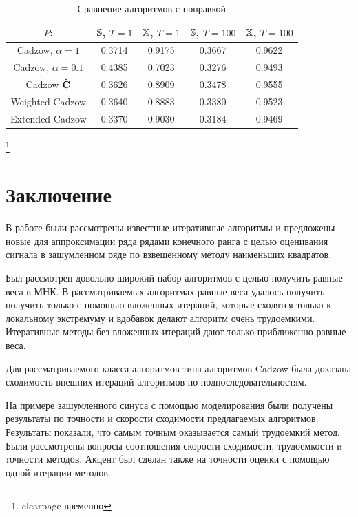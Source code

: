\documentclass[12pt,a4paper,fleqn,leqno]{article}
\begin{document}
\begin{table}[!hhh]
	\begin{center}
		\caption{Сравнение алгоритмов с поправкой}\label{fintable_improved}
		\begin{tabular}{|c|c|c|c|c|}
			\hline
			$P$: & $\mathbb{S}$, $T = 1$ & $\mathbb{X}$, $T = 1$ & $\mathbb{S}$, $T = 100$ & $\mathbb{X}$, $T = 100$  \\
			\hline
			Cadzow, $\alpha = 1$ & 0.3714 & 0.9175 & 0.3667 & 0.9622 \\
			\hline
			Cadzow, $\alpha = 0.1$ & 0.4385 & 0.7023 & 0.3276 & 0.9493 \\
			\hline
			Cadzow $\hat{\mathbf{C}}$ & 0.3626 & 0.8909 & 0.3478 & 0.9555 \\
			\hline
			Weighted Cadzow & 0.3640 & 0.8883 & 0.3380 & 0.9523 \\
			\hline
			Extended Cadzow & 0.3370 & 0.9030 & 0.3184 & 0.9469 \\
			\hline
		\end{tabular}
	\end{center}
\end{table}


\clearpage
\footnote{clearpage временно}
\section{Заключение}
\label{sec:concl}
В работе были рассмотрены известные итеративные алгоритмы и предложены новые для аппроксимации ряда рядами конечного ранга с целью
оценивания сигнала в зашумленном ряде по взвешенному методу наименьших квадратов.


Был рассмотрен довольно широкий набор алгоритмов с целью получить равные веса в МНК. В рассматриваемых алгоритмах равные веса удалось получить 
получить только с помощью вложенных итераций, которые сходятся только к локальному экстремуму и вдобавок делают алгоритм очень трудоемкими.
Итеративные методы без вложенных итераций дают только приближенно равные веса.

Для рассматриваемого класса алгоритмов типа алгоритмов Cadzow была доказана сходимость внешних итераций алгоритмов по подпоследовательностям.

На примере зашумленного синуса с помощью моделирования были получены результаты по точности и скорости сходимости предлагаемых алгоритмов.
Результаты показали, что самым точным оказывается самый трудоемкий метод. 
Были рассмотрены вопросы соотношения скорости сходимости, трудоемкости и точности методов.
Акцент был сделан также на точности оценки с помощью одной итерации методов.
\end{document}
